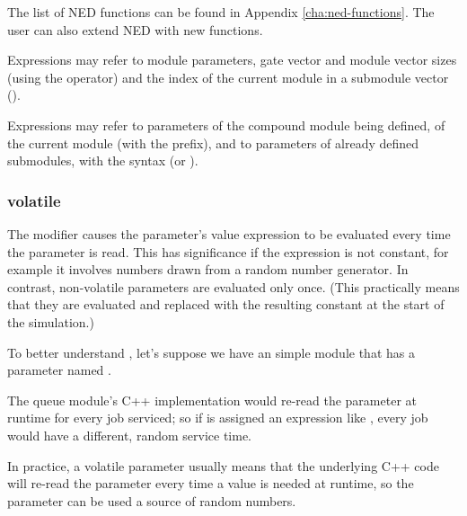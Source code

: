 \begin{note}
    The list of NED functions can be found in Appendix \ref{cha:ned-functions}.
    The user can also extend NED with new functions.
\end{note}


Expressions may refer to module parameters, gate vector and module vector sizes
(using the  operator) and the index of the current module
in a submodule vector ().


Expressions may refer to parameters of the compound module being defined,
of the current module (with the  prefix), and to parameters
of already defined submodules, with the syntax 
(or ).




\subsubsection{volatile}

The  modifier causes the parameter's value expression to
be evaluated every time the parameter is read. This has significance if the
expression is not constant, for example it involves numbers drawn from a
random number generator. In contrast, non-volatile parameters are evaluated
only once. (This practically means that they are evaluated and replaced
with the resulting constant at the start of the simulation.)

To better understand , let's suppose we have an
 simple module that has a  parameter
named .

The queue module's C++ implementation would re-read the 
parameter at runtime for every job serviced; so if  is
assigned an expression like , every job would have
a different, random service time.

In practice, a volatile parameter usually means that the underlying C++
code will re-read the parameter every time a value is needed at runtime, so
the parameter can be used a source of random numbers.

